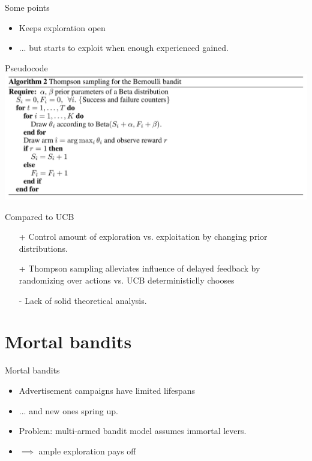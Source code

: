 \documentclass{beamer}
\begin{document}
\begin{frame}{Some points}
  \begin{itemize}
    \item{Keeps exploration open}
    \item{... but starts to exploit when enough experienced gained.}
  \end{itemize}
\end{frame}

\begin{frame}{Pseudocode}
  \includegraphics[width=\linewidth]{algo.png}
\end{frame}

\begin{frame}{Compared to UCB}
  \begin{itemize}
    \item[+]{Control amount of exploration vs. exploitation by changing prior
      distributions.}
    \item[+]{Thompson sampling alleviates influence of delayed feedback by
      randomizing over actions vs. UCB deterministiclly chooses}
    \item[-]{Lack of solid theoretical analysis.}
  \end{itemize}
\end{frame}

\section{Mortal bandits}
\frame{\sectionpage}

\begin{frame}{Mortal bandits}
  \begin{itemize}
    \item{Advertisement campaigns have limited lifespans}
    \item{... and new ones spring up.}
    \item{Problem: multi-armed bandit model assumes immortal levers.}
    \item{$\implies$ ample exploration pays off}
  \end{itemize}
\end{frame}
\end{document}
